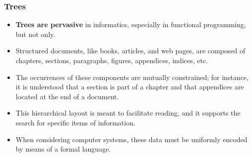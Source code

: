 \documentclass[compress,dvips,xcolor={dvipsnames},t]{beamer}
\begin{document}
\begin{frame}
  \frametitle{Trees}

  \begin{itemize}

    \item \textbf{Trees are pervasive} in informatics, especially in
      functional programming, but not only.

    \item Structured documents, like books, articles, and web pages,
      are composed of chapters, sections, paragraphs, figures,
      appendices, indices, etc.

    \item The occurrences of these components are mutually
      constrained; for instance, it is understood that a section is
      part of a chapter and that appendices are located at the end of
      a document.

    \item This hierarchical layout is meant to facilitate reading, and
      it supports the search for specific items of information.

    \item When considering computer systems, these data must be
      uniformly encoded by means of a formal language.

  \end{itemize}

\end{frame}
\end{document}
